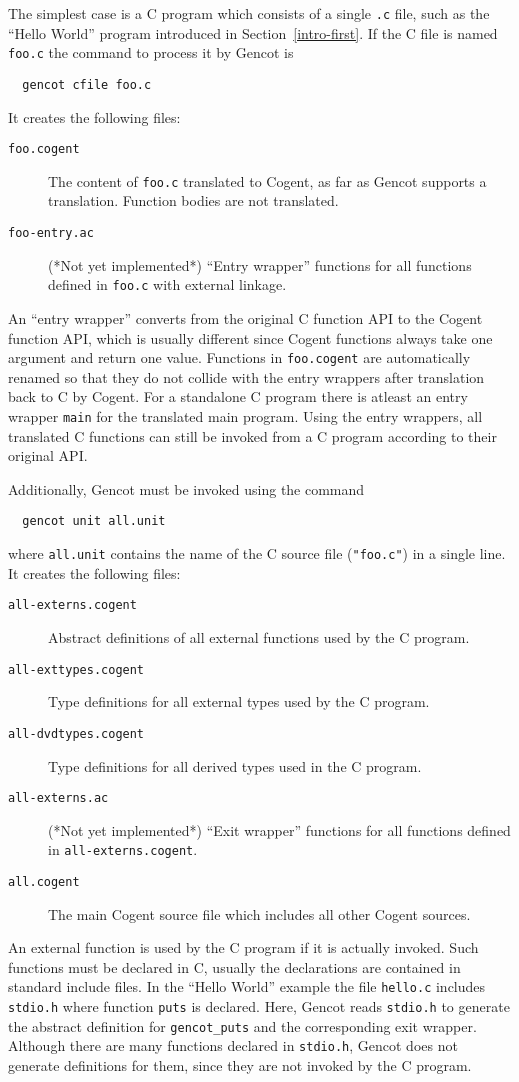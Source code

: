 \documentclass[a4paper]{report}
\newcommand{\code}[1]{\textnormal{\texttt{#1}}}
\begin{document}
The simplest case is a C program which consists of a single \code{.c} file, such as the ``Hello World'' program
introduced in Section~\ref{intro-first}. If the C file is named \code{foo.c} the command to process it by Gencot is
\begin{verbatim}
  gencot cfile foo.c
\end{verbatim}
It creates the following files:
\begin{description}
\item[\code{foo.cogent}] The content of \code{foo.c} translated to Cogent, as far as Gencot supports a translation.
Function bodies are not translated.
\item[\code{foo-entry.ac}] (*Not yet implemented*) ``Entry wrapper'' functions for all functions defined in \code{foo.c} 
with external linkage.
\end{description}

An ``entry wrapper'' converts from the original C function API to the Cogent function API, which is usually different 
since Cogent functions always take one argument and return one value. Functions in \code{foo.cogent} are automatically
renamed so that they do not collide with the entry wrappers after translation back to C by Cogent. For a standalone
C program there is atleast an entry wrapper \code{main} for the translated main program. Using the entry wrappers, all
translated C functions can still be invoked from a C program according to their original API.

Additionally, Gencot must be invoked using the command
\begin{verbatim}
  gencot unit all.unit
\end{verbatim}
where \code{all.unit} contains the name of the C source file (\code{"foo.c"}) in a single line. It creates the following
files:
\begin{description}
\item[\code{all-externs.cogent}] Abstract definitions of all external functions used by the C program.
\item[\code{all-exttypes.cogent}] Type definitions for all external types used by the C program.
\item[\code{all-dvdtypes.cogent}] Type definitions for all derived types used in the C program.
\item[\code{all-externs.ac}] (*Not yet implemented*) ``Exit wrapper'' functions for all functions defined in 
\code{all-externs.cogent}.
\item[\code{all.cogent}] The main Cogent source file which includes all other Cogent sources.
\end{description}
An external function is used by the C program if it is actually invoked. Such functions must be declared in C, usually
the declarations are contained in standard include files. In the ``Hello World'' example the file \code{hello.c} includes
\code{stdio.h} where function \code{puts} is declared. Here, Gencot reads \code{stdio.h} to generate the abstract definition for
\code{gencot\_puts} and the corresponding exit wrapper. Although there are many functions declared in \code{stdio.h}, Gencot
does not generate definitions for them, since they are not invoked by the C program.
\end{document}
